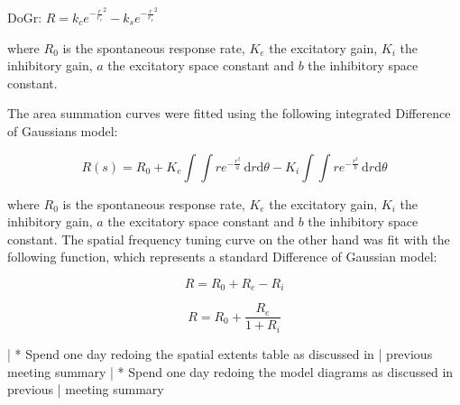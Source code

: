DoGr: $R = k_c e^{-\frac{r}{r_c}^2} - k_s e^{-\frac{r}{r_s}^2}$

where $R_0$ is the spontaneous response rate, $K_e$ the
excitatory gain, $K_i$ the inhibitory gain, $a$ the excitatory
space constant and $b$ the inhibitory space constant.

The area summation curves were fitted using the following
integrated Difference of Gaussians model:

\begin{equation}
R(s) = R_0 + K_e \int \int re^{-\frac{r^2}{a}} \,
\mathrm{d}r\mathrm{d}\theta - K_i \int\int re^{-\frac{r^2}{b}} \,
\mathrm{d}r\mathrm{d}\theta
\label{iDoG}
\end{equation}

\noindent where $R_0$ is the spontaneous response rate, $K_e$ the
excitatory gain, $K_i$ the inhibitory gain, $a$ the excitatory space
constant and $b$ the inhibitory space constant. The spatial frequency
tuning curve on the other hand was fit with the following function,
which represents a standard Difference of Gaussian model:

\begin{equation}
R = R_0 + R_e - R_i
\label{DoG1}
\end{equation}

\begin{equation}
R = R_0 + \frac{R_e}{1+R_i}
\label{DoG2}
\end{equation}



|  * Spend one day redoing the spatial extents table as discussed in 
|  previous meeting summary
|  * Spend one day redoing the model diagrams as discussed in previous 
|  meeting summary
